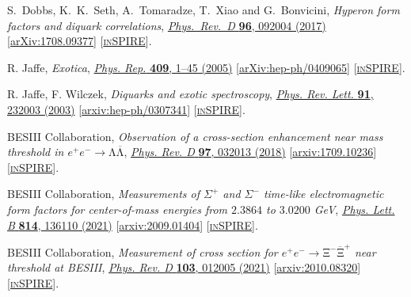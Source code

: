 \documentclass[a4paper,11pt]{article}
\begin{document}
\begin{thebibliography}{**}
 S.~Dobbs, K.~K.~Seth, A.~Tomaradze, T.~Xiao and G.~Bonvicini, 
\textit{Hyperon form factors and diquark correlations},
\href{https://journals.aps.org/prd/abstract/10.1103/PhysRevD.96.092004}{\textit{Phys.\ Rev.\ D} {\bf 96}, 092004 (2017)}
[\textcolor{blue}{\href{https://arxiv.org/pdf/1708.09377.pdf}{arXiv:1708.09377}}] 
[\textcolor{blue}{\href{https://inspirehep.net/literature/1620697}{\textsc{inSPIRE}}}].

 R. Jaffe,
\textit{Exotica}, \href{https://www.sciencedirect.com/science/article/abs/pii/S0370157304005320}{\textit{Phys. Rep.} {\bf 409}, 1–45 (2005)}
[\textcolor{blue}{\href{https://arxiv.org/pdf/hep-ph/0409065.pdf}{arXiv:hep-ph/0409065}}] 
[\textcolor{blue}{\href{https://inspirehep.net/literature/658533}{\textsc{inSPIRE}}}].

 R. Jaffe, F. Wilczek, 
\textit{Diquarks and exotic spectroscopy},
\href{https://journals.aps.org/prl/abstract/10.1103/PhysRevLett.91.232003}{\textit{Phys. Rev. Lett.} {\bf 91}, 232003 (2003)}
[\textcolor{blue}{\href{https://arxiv.org/pdf/hep-ph/0307341.pdf}{arxiv:hep-ph/0307341}}] 
[\textcolor{blue}{\href{https://inspirehep.net/literature/624241}{\textsc{inSPIRE}}}].

BESIII Collaboration,
\textit{Observation of a cross-section enhancement near mass threshold in ${e}^{+}{e}^{\ensuremath{-}}\ensuremath{\rightarrow}\mathrm{\ensuremath{\Lambda}}\overline{\mathrm{\ensuremath{\Lambda}}}$},
\href{https://journals.aps.org/prd/abstract/10.1103/PhysRevD.97.032013}{\textit{Phys. Rev. D} \textbf{97}, 032013 (2018)}
[\textcolor{blue}{\href{https://arxiv.org/pdf/1709.10236.pdf}{arxiv:1709.10236}}] 
[\textcolor{blue}{\href{https://inspirehep.net/literature/1627871}{\textsc{inSPIRE}}}].

BESIII Collaboration,
\textit{Measurements of $\Sigma^+$ and $\Sigma^-$ time-like electromagnetic form factors for center-of-mass energies from $2.3864$ to $3.0200$ GeV},
\href{https://www.sciencedirect.com/science/article/pii/S0370269321000502?via%3Dihub}{\textit{Phys. Lett. B} \textbf{814}, 136110 (2021)}
[\textcolor{blue}{\href{https://arxiv.org/pdf/2009.01404.pdf}{arxiv:2009.01404}}] 
[\textcolor{blue}{\href{https://inspirehep.net/literature/1814783}{\textsc{inSPIRE}}}].

BESIII Collaboration,
\textit{Measurement of cross section for ${e}^{+}{e}^{\ensuremath{-}}\ensuremath{\rightarrow}{\mathrm{\ensuremath{\Xi}}}^{\ensuremath{-}}{\overline{\mathrm{\ensuremath{\Xi}}}}^{+}$ near threshold at BESIII},
\href{https://journals.aps.org/prd/abstract/10.1103/PhysRevD.103.012005}{\textit{Phys. Rev. D} \textbf{103}, 012005 (2021)}
[\textcolor{blue}{\href{https://arxiv.org/pdf/2010.08320.pdf}{arxiv:2010.08320}}] 
[\textcolor{blue}{\href{https://inspirehep.net/literature/1823448}{\textsc{inSPIRE}}}].


\end{thebibliography}
\end{document}
